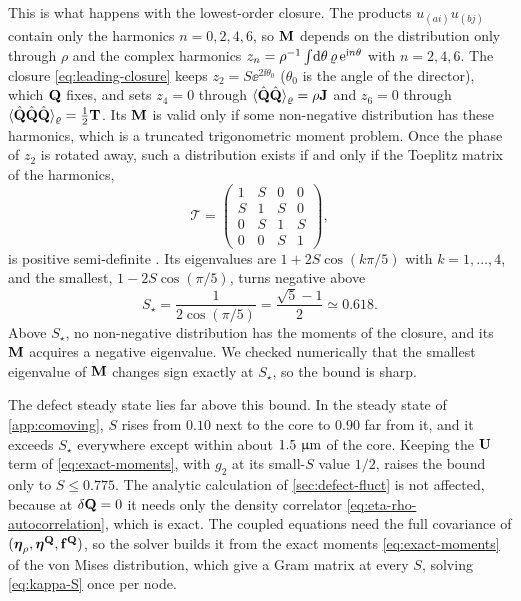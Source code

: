 \documentclass[aps,pre,reprint,superscriptaddress,longbibliography,nofootinbib
]{revtex4-2}
\begin{document}
This is what happens with the lowest-order closure. The
products $u_{(ai)}u_{(bj)}$ contain only the harmonics
$n=0,2,4,6$, so $\mathbf{M}$ depends on the distribution only
through $\rho$ and the complex harmonics
$z_n=\rho^{-1}\int\!\mathrm{d}\theta\,\varrho\,\mathrm{e}^{\mathrm{i} n\theta}$
with $n=2,4,6$. The closure \cref{eq:leading-closure} keeps
$z_2=S\ee^{2\ii\theta_0}$ ($\theta_0$ is the angle of the
director), which $\mathbf{Q}$ fixes, and sets $z_4=0$ through
$\langle\hat{\mathbf{Q}}\hat{\mathbf{Q}}\rangle_\varrho=\rho\mathbf{J}$ and $z_6=0$
through
$\langle\hat{\mathbf{Q}}\hat{\mathbf{Q}}\hat{\mathbf{Q}}\rangle_\varrho=\tfrac12\mathbf{T}$. Its
$\mathbf{M}$ is valid only if some non-negative distribution has
these harmonics, which is a truncated trigonometric moment
problem. Once the phase of $z_2$ is rotated away, such a
distribution exists if and only if the Toeplitz matrix of
the harmonics,
\begin{equation}
  \label{eq:toeplitz}
  \mathcal T=\begin{pmatrix}1&S&0&0\\S&1&S&0\\0&S&1&S\\0&0&S&1\end{pmatrix},
\end{equation}
is positive semi-definite \cite{grenander1958toeplitz}. Its
eigenvalues are $1+2S\cos(k\pi/5)$ with $k=1,\dots,4$, and
the smallest, $1-2S\cos(\pi/5)$, turns negative above
\begin{equation}
  \label{eq:golden-bound}
  S_\star=\frac1{2\cos(\pi/5)}=\frac{\sqrt5-1}2\simeq0.618 .
\end{equation}
Above $S_\star$, no non-negative distribution has the
moments of the closure, and its $\mathbf{M}$ acquires a negative
eigenvalue. We checked numerically that the smallest
eigenvalue of $\mathbf{M}$ changes sign exactly at $S_\star$, so
the bound is sharp.

The defect steady state lies far above this bound. In the
steady state of \cref{app:comoving}, $S$ rises from $0.10$
next to the core to $0.90$ far from it, and it exceeds
$S_\star$ everywhere except within about $1.5~\upmu\mathrm{m}$ of
the core. Keeping the $\mathbf{U}$ term of \cref{eq:exact-moments},
with $g_2$ at its small-$S$ value $1/2$, raises the bound
only to $S\le0.775$. The analytic calculation of
\cref{sec:defect-fluct} is not affected, because at
$\delta\mathbf{Q}=0$ it needs only the density correlator
\cref{eq:eta-rho-autocorrelation}, which is exact. The
coupled equations need the full covariance of
$(\boldsymbol\eta_\rho,\boldsymbol\eta^{\mathbf{Q}},\mathbf{f}^{\mathbf{Q}})$, so the solver builds it from
the exact moments \cref{eq:exact-moments} of the von Mises
distribution, which give a Gram matrix at every $S$,
solving \cref{eq:kappa-S} once per node.
\end{document}
